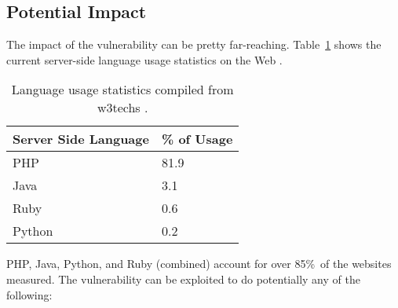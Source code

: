 \subsection{Potential Impact}

The impact of the vulnerability can be pretty far-reaching.
Table~\ref{tab:usage} shows the current server-side language usage statistics on the Web \cite{W3techs}. 

\begin{table}[!tb]
	\centering
	\begin{tabular}{|p{4cm}|p{4cm}|}
		\hline
		\multicolumn{1}{|c|}{\textbf{Server Side Language}} & \multicolumn{1}{c|}{\textbf{\% of Usage}}\\
		\hline
		PHP & 81.9\\
		\hline
		Java & 3.1\\
		\hline
		Ruby & 0.6\\
		\hline
		Python & 0.2\\
		\hline
		
	\end{tabular}
	\caption[]{Language usage statistics compiled from w3techs \cite{W3techs}.}
	\label{tab:usage}
\end{table}

PHP, Java, Python, and Ruby (combined) account for over 85\%\,\footnotemark{} of the websites measured. The vulnerability can be exploited to do potentially any of the following:


